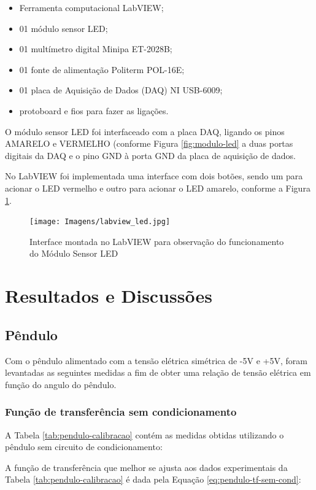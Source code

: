 \documentclass[a4paper]{instrumentacao}
\begin{document}
\begin{itemize}
	\item Ferramenta computacional LabVIEW;
	\item 01 módulo sensor LED;
	\item 01 multímetro digital Minipa ET-2028B;
	\item 01 fonte de alimentação Politerm POL-16E;
	\item 01 placa de Aquisição de Dados (DAQ) NI  USB-6009;
	\item protoboard e fios para fazer as ligações. 
\end{itemize}

O módulo sensor LED foi interfaceado com a placa DAQ, ligando os pinos AMARELO e VERMELHO (conforme Figura \ref{fig:modulo-led} a duas portas digitais da DAQ e o pino GND à porta GND da placa de aquisição de dados.

No LabVIEW foi implementada uma interface com dois botões, sendo um para acionar o LED vermelho e outro para acionar o LED amarelo, conforme a Figura \ref{fig:labview-led}.

\begin{figure}[H]
\centering
\texttt{[image: Imagens/labview\_led.jpg]}
\caption{Interface montada no LabVIEW para observação do funcionamento do Módulo Sensor LED}
\label{fig:labview-led}
\end{figure}

\chapter{Resultados e Discussões}
\section{Pêndulo}

Com o pêndulo alimentado com a tensão elétrica simétrica de -5V e +5V, foram levantadas as seguintes medidas a fim de obter uma relação de tensão elétrica em função do angulo do pêndulo. 

\subsection{Função de transferência sem condicionamento}
A Tabela \ref{tab:pendulo-calibracao} contém as medidas obtidas utilizando o pêndulo sem circuito de condicionamento:

A função de transferência que melhor se ajusta aos dados experimentais da Tabela \ref{tab:pendulo-calibracao} é dada pela Equação \ref{eq:pendulo-tf-sem-cond}:
\end{document}
